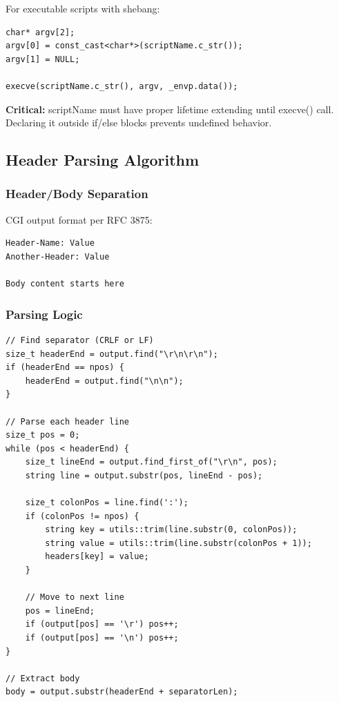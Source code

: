 \documentclass[11pt,a4paper]{article}
\begin{document}
For executable scripts with shebang:

\begin{lstlisting}[caption=Direct Execution]
char* argv[2];
argv[0] = const_cast<char*>(scriptName.c_str());
argv[1] = NULL;

execve(scriptName.c_str(), argv, _envp.data());
\end{lstlisting}

\textbf{Critical:} scriptName must have proper lifetime extending until execve() call. Declaring it outside if/else blocks prevents undefined behavior.

\subsection{Header Parsing Algorithm}

\subsubsection{Header/Body Separation}

CGI output format per RFC 3875:

\begin{verbatim}
Header-Name: Value
Another-Header: Value

Body content starts here
\end{verbatim}

\subsubsection{Parsing Logic}

\begin{lstlisting}[caption=Header Parsing]
// Find separator (CRLF or LF)
size_t headerEnd = output.find("\r\n\r\n");
if (headerEnd == npos) {
    headerEnd = output.find("\n\n");
}

// Parse each header line
size_t pos = 0;
while (pos < headerEnd) {
    size_t lineEnd = output.find_first_of("\r\n", pos);
    string line = output.substr(pos, lineEnd - pos);
    
    size_t colonPos = line.find(':');
    if (colonPos != npos) {
        string key = utils::trim(line.substr(0, colonPos));
        string value = utils::trim(line.substr(colonPos + 1));
        headers[key] = value;
    }
    
    // Move to next line
    pos = lineEnd;
    if (output[pos] == '\r') pos++;
    if (output[pos] == '\n') pos++;
}

// Extract body
body = output.substr(headerEnd + separatorLen);
\end{lstlisting}
\end{document}
